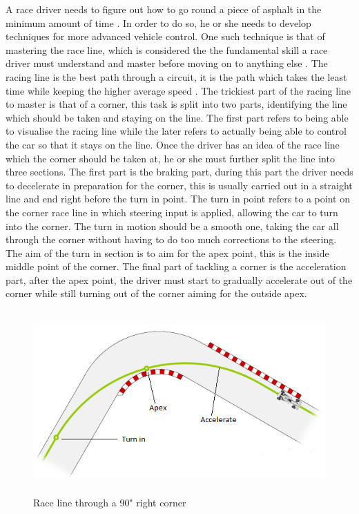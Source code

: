 A race driver needs to figure out how to go round a piece of asphalt in the minimum amount of time \cite{GoingFaster}. In order to do so, he or she needs to develop techniques for more advanced vehicle control. One such technique is that of mastering the race line, which is considered the the fundamental skill a race driver must understand and master before moving on to anything else \cite{GoingFaster}. The racing line is the best path through a circuit, it is the path which takes the least time while keeping the higher average speed \cite{beckman1991physics}. The trickiest part of the racing line to master is that of a corner, this task is  split into two parts, identifying the line which should be taken and staying on the line. The first part refers to being able to visualise the racing line while the later refers to actually being able to control the car so that it stays on the line. Once the driver has an idea of the race line which the corner should be taken at, he or she must further split the line into three sections. The first part is the braking part, during this part the driver needs to decelerate in preparation for the corner, this is usually carried out in a straight line and end right before the turn in point. The turn in point refers to a point on the corner race line in which steering input is applied, allowing the car to turn into the corner. The turn in motion should be a smooth one, taking the car all through the corner without having to do too much corrections to the steering. The aim of the turn in section is to aim for the apex point, this is the inside middle point of the corner. The final part of tackling a corner is the acceleration part, after the apex point, the driver must start to gradually accelerate out of the corner while still turning out of the corner aiming for the outside apex.

\begin{figure}[!htb]
	\centering
	\includegraphics[height=7cm]{images/cornerraceline}
	\caption{Race line through a 90" right corner}
	\label{fig:CornerRaceLine}
\end{figure}

